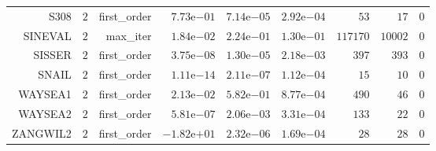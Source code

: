 \begin{longtable}{rrrrrrrrr}
S308 & \(     2\) & first\_order & \( 7.73\)e\(-01\) & \( 7.14\)e\(-05\) & \( 2.92\)e\(-04\) & \(    53\) & \(    17\) & \(     0\) \\
SINEVAL & \(     2\) & max\_iter & \( 1.84\)e\(-02\) & \( 2.24\)e\(-01\) & \( 1.30\)e\(-01\) & \(117170\) & \( 10002\) & \(     0\) \\
SISSER & \(     2\) & first\_order & \( 3.75\)e\(-08\) & \( 1.30\)e\(-05\) & \( 2.18\)e\(-03\) & \(   397\) & \(   393\) & \(     0\) \\
SNAIL & \(     2\) & first\_order & \( 1.11\)e\(-14\) & \( 2.11\)e\(-07\) & \( 1.12\)e\(-04\) & \(    15\) & \(    10\) & \(     0\) \\
WAYSEA1 & \(     2\) & first\_order & \( 2.13\)e\(-02\) & \( 5.82\)e\(-01\) & \( 8.77\)e\(-04\) & \(   490\) & \(    46\) & \(     0\) \\
WAYSEA2 & \(     2\) & first\_order & \( 5.81\)e\(-07\) & \( 2.06\)e\(-03\) & \( 3.31\)e\(-04\) & \(   133\) & \(    22\) & \(     0\) \\
ZANGWIL2 & \(     2\) & first\_order & \(-1.82\)e\(+01\) & \( 2.32\)e\(-06\) & \( 1.69\)e\(-04\) & \(    28\) & \(    28\) & \(     0\) \\\hline
\end{longtable}

